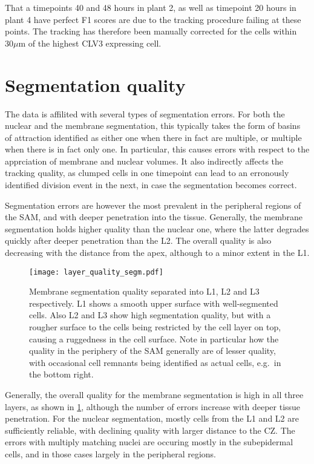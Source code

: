 That a timepoints 40 and 48 hours in plant 2, as well as timepoint 20 hours in
plant 4 have perfect F1 scores are due to the tracking procedure failing at
these points. The tracking has therefore been manually corrected for the cells
within $30\mu$m of the highest CLV3 expressing cell.

\section{Segmentation quality}
\label{sec:data_errors_segmentation}
The data is affilited with several types of segmentation errors. For both the
nuclear and the membrane segmentation, this typically takes the form of basins
of attraction identified as either one when there in fact are multiple, or
multiple when there is in fact only one. In particular, this causes errors with
respect to the apprciation of membrane and nuclear volumes. It also indirectly
affects the tracking quality, as clumped cells in one timepoint can lead to an
erronously identified division event in the next, in case the segmentation
becomes correct. 

Segmentation errors are however the most prevalent in the peripheral regions of
the SAM, and with deeper penetration into the tissue. Generally, the membrane
segmentation holds higher quality than the nuclear one, where the latter
degrades quickly after deeper penetration than the L2. The overall quality is
also decreasing with the distance from the apex, although to a minor extent in
the L1. 

\begin{figure}[H]
  \centering
  \texttt{[image: layer\_quality\_segm.pdf]}
  \caption[Membrane segmentation quality per layer]{Membrane segmentation
    quality separated into L1, L2 and L3 respectively. L1 shows a smooth upper
    surface with well-segmented cells. Also L2 and L3 show high segmentation
    quality, but with a rougher surface to the cells being restricted by the
    cell layer on top, causing a ruggedness in the cell surface. Note in
    particular how the quality in the periphery of the SAM generally are of
    lesser quality, with occasional cell remnants being identified as actual
    cells, e.g.\ in the bottom right.}
  \label{fig:layer_quality_segm}
\end{figure}

Generally, the overall quality for the membrane segmentation is high in all
three layers, as shown in \cref{fig:layer_quality_segm}, although the number of errors increase with deeper tissue
penetration. For the nuclear segmentation, mostly cells from the L1 and L2 are
sufficiently reliable, with declining quality with larger distance to the CZ.
The errors with multiply matching nuclei are occuring mostly in the subepidermal
cells, and in those cases largely in the peripheral regions.

